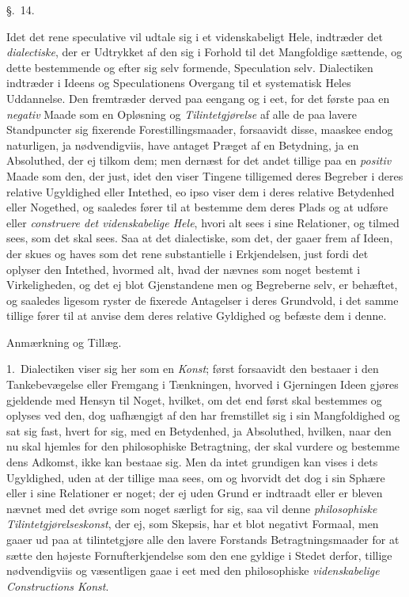 \documentclass[12pt,a4paper]{book}
\newcommand{\apage}[1]{\marginnote{\footnotesize\textit{[#1]}}}
\begin{document}
\begin{center}\large\S.~14.\end{center}

Idet det rene speculative vil udtale sig i et videnskabeligt Hele, indtræder det
\emph{dialectiske}, der er Udtrykket af den sig i Forhold til det Mangfoldige
sættende, og dette bestemmende og efter sig selv formende, Speculation selv.
Dialectiken indtræder i Ideens og Speculationens Overgang til et systematisk
Heles Uddannelse. Den fremtræder derved paa eengang og i eet, for det første paa
en \emph{negativ} Maade som en Opløsning og \emph{Tilintetgjørelse} af alle de paa lavere
Standpuncter sig fixerende Forestillingsmaader, forsaavidt disse, maaskee endog
naturligen, ja nødvendigviis, have antaget Præget af en Betydning, ja en
Absoluthed, der ej tilkom dem; men dernæst for det andet tillige paa en
\emph{positiv} Maade som den, der just, idet den viser Tingene tilligemed deres
Begreber i deres relative Ugyldighed eller Intethed, eo ipso viser dem i
deres relative Betydenhed eller Nogethed, og saaledes fører til at bestemme dem
deres Plads og at udføre eller \emph{construere det videnskabelige Hele}, hvori
alt sees i sine Relationer, og tilmed sees, som det skal sees. Saa at det
\apage{129} dialectiske, som det, der gaaer frem af Ideen, der skues og haves som det rene
substantielle i Erkjendelsen, just fordi det oplyser den Intethed, hvormed alt,
hvad der nævnes som noget bestemt i Virkeligheden, og det ej blot Gjenstandene men
og Begreberne selv, er behæftet, og saaledes ligesom ryster de fixerede
Antagelser i deres Grundvold, i det samme tillige fører til at anvise dem deres
relative Gyldighed og befæste dem i denne.

\begin{center}Anmærkning og Tillæg.\end{center}

1.~Dialectiken viser sig her som en \emph{Konst}; først forsaavidt den bestaaer i
den Tankebevægelse eller Fremgang i Tænkningen, hvorved i Gjerningen Ideen gjøres
gjeldende med Hensyn til Noget, hvilket, om det end først skal bestemmes og
oplyses ved den, dog uafhængigt af den har fremstillet sig i sin Mangfoldighed og
sat sig fast, hvert for sig, med en Betydenhed, ja Absoluthed, hvilken, naar den
nu skal hjemles for den philosophiske Betragtning, der skal vurdere og bestemme
dens Adkomst, ikke kan bestaae sig. Men da intet grundigen kan vises i dets
Ugyldighed, uden at der tillige maa sees, om og hvorvidt det dog i sin Sphære
eller i sine Relationer er noget; der ej uden Grund er indtraadt eller er bleven
nævnet med det øvrige som noget særligt for sig, saa vil denne \emph{philosophiske
\apage{130} Tilintetgjørelseskonst}, der ej, som Skepsis, har et blot negativt Formaal, men
gaaer ud paa at tilintetgjøre alle den lavere Forstands Betragtningsmaader for at
sætte den højeste Fornufterkjendelse som den ene gyldige i Stedet derfor, tillige
nødvendigviis og væsentligen gaae i eet med den philosophiske \emph{videnskabelige
Constructions Konst}.
\end{document}
